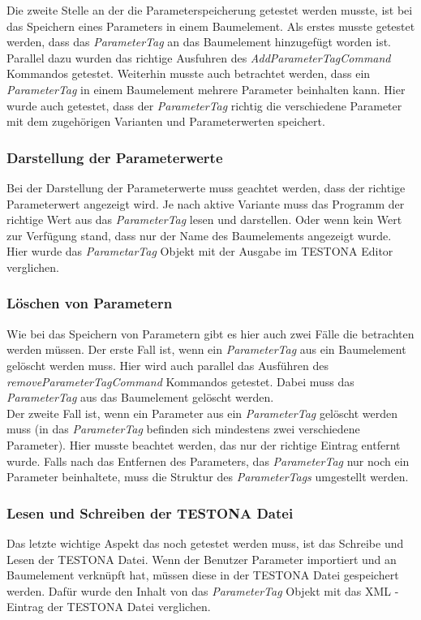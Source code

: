 Die zweite Stelle an der die Parameterspeicherung getestet werden musste, ist bei das Speichern eines Parameters in einem Baumelement. Als erstes musste getestet werden, dass das \textit{ParameterTag} an das Baumelement hinzugefügt worden ist. Parallel dazu wurden das richtige Ausfuhren des \textit{AddParameterTagCommand} Kommandos getestet. Weiterhin musste auch betrachtet werden, dass ein \textit{ParameterTag} in einem Baumelement mehrere Parameter beinhalten kann. Hier wurde auch getestet, dass der \textit{ParameterTag} richtig die verschiedene Parameter mit dem zugehörigen Varianten und Parameterwerten speichert.\\



\subsubsection{Darstellung der Parameterwerte}
Bei der Darstellung der Parameterwerte muss geachtet werden, dass der richtige Parameterwert angezeigt wird. Je nach aktive Variante muss das Programm der richtige Wert aus das \textit{ParameterTag} lesen und darstellen. Oder wenn kein Wert zur Verfügung stand, dass nur der Name des Baumelements angezeigt wurde. Hier wurde das \textit{ParametarTag} Objekt mit der Ausgabe im TESTONA Editor verglichen.\\


\subsubsection{Löschen von Parametern}
Wie bei das Speichern von Parametern gibt es hier auch zwei Fälle die betrachten werden müssen. Der erste Fall ist, wenn ein \textit{ParameterTag} aus ein Baumelement gelöscht werden muss. Hier wird auch parallel das Ausführen des \textit{removeParameterTagCommand} Kommandos getestet. Dabei muss das \textit{ParameterTag} aus das Baumelement gelöscht werden.\\


Der zweite Fall ist, wenn ein Parameter aus ein \textit{ParameterTag} gelöscht werden muss (in das \textit{ParameterTag} befinden sich mindestens zwei verschiedene Parameter). Hier musste beachtet werden, das nur der richtige Eintrag entfernt wurde. Falls nach das Entfernen des Parameters, das \textit{ParameterTag} nur noch ein Parameter beinhaltete, muss die Struktur des \textit{ParameterTags} umgestellt werden.\\


\subsubsection{Lesen und Schreiben der TESTONA Datei}
Das letzte wichtige Aspekt das noch getestet werden muss, ist das Schreibe und Lesen der TESTONA Datei. Wenn der Benutzer Parameter importiert und an Baumelement verknüpft hat, müssen diese in der TESTONA Datei gespeichert werden. Dafür wurde den Inhalt von das \textit{ParameterTag} Objekt mit das XML - Eintrag der TESTONA Datei verglichen.\\



